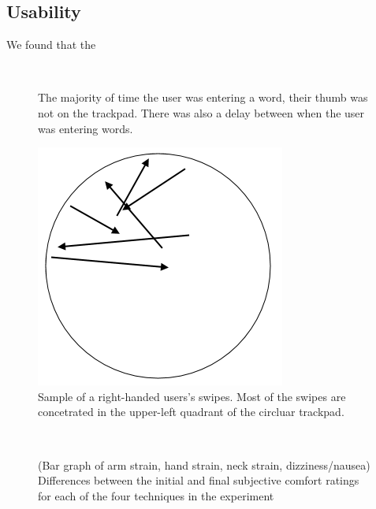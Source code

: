 \subsection{Usability}
We found that the 

\begin{figure}
\centering
  \caption{The majority of time the user was entering a word, their thumb was not on the trackpad.  There was also a delay between when the user was entering words.
    }
  ~\label{fig:distance}
  \end{figure}

\begin{figure}
\centering
\includegraphics[width=0.5\columnwidth]{figures/circle}
  \caption{Sample of a right-handed users's swipes.  Most of the swipes are concetrated in the upper-left quadrant of the circluar trackpad.}

\label{fig:circle}

\end{figure}

\begin{figure}
\centering
{}


  \caption{(Bar graph of arm strain, hand strain, neck strain, dizziness/nausea)  Differences between the initial and final subjective comfort ratings for each of the four techniques in the experiment 
}~\label{fig:graphLearning}
\end{figure}


